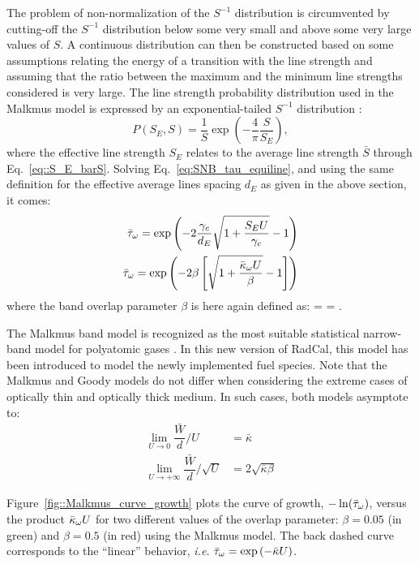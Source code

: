 The problem of non-normalization of the $S^{-1}$ distribution is circumvented by cutting-off the $S^{-1}$ distribution below some very small and above some very large values of $S$. A continuous distribution can then be constructed based on some assumptions relating the energy of a transition with the line strength and assuming that the ratio between the maximum and the minimum line strengths considered is very large. The line strength probability distribution used in the Malkmus model is expressed by an exponential-tailed $S^{-1}$ distribution \cite{Malkmus1967,Young1977d}:
\begin{equation}
 P(S_E,S) = \dfrac{1}{S}\exp\left(-\dfrac{4}{\pi}\dfrac{S}{S_E} \right),
\end{equation}
where the effective line strength $S_E$ relates to the average line strength $\bar{S}$ through Eq.~\ref{eq::S_E_barS}. Solving Eq.~\ref{eq:SNB_tau_equiline}, and using the same definition for the effective average lines spacing $d_E$ as given in the above section, it comes:
\begin{align}\label{eq::Malkmus}
    \bar{\tau}_{\omega} = \exp\left( -2 \dfrac{\gamma_c}{d_E} {\displaystyle \sqrt{1+\frac{S_E U}{\gamma_c }} -1 }\right) \nonumber \\
    \bar{\tau}_{\omega} =  \exp\left(-2  \beta \left[\sqrt{1+\dfrac{\bar{\kappa}_{\omega}U}{\beta} }- 1\right] \right)
\end{align}
where the band overlap parameter $\beta$ is here again defined as:
\be
\beta =  = .
\ee

The Malkmus band model is recognized as the most suitable statistical narrow-band model for polyatomic gases \cite{Modest2013}. In this new version of RadCal, this model has been introduced to model the newly implemented fuel species. Note that the Malkmus and Goody models do not differ when considering the extreme cases of optically thin and optically thick medium. In such cases, both models asymptote to:
\begin{align}
\lim_{U \to 0} \dfrac{\bar{W}}{d}/U &= \bar{\kappa} \\
\lim_{U \to +\infty} \dfrac{\bar{W}}{d}/\sqrt{U} &= 2\displaystyle\sqrt{\bar{\kappa}\beta}
\end{align}

Figure~\ref{fig::Malkmus_curve_growth} plots the curve of growth, $-\ln(\bar{\tau}_{\omega})$, versus the product $\bar{\kappa}_{\omega} U$ for two different values of the overlap parameter: $\beta = 0.05$ (in green) and $\beta = 0.5$ (in red) using the Malkmus model. The back dashed curve corresponds to the ``linear'' behavior, \textit{i.e.} $\bar{\tau}_{\omega} = \exp\left(-\bar{\kappa} U\right)$.

